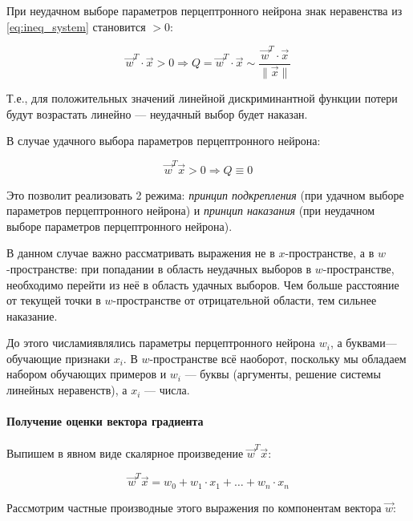 \documentclass{article}
\numberwithin{equation}{subsection}
\begin{document}
При неудачном выборе параметров перцептронного нейрона знак неравенства 
из \ref{eq:ineq_system} становится $>0$:

\begin{equation}
    \vec{w}^T \cdot \vec{x} >0 \Rightarrow Q = \vec{w}^T \cdot \vec{x} \sim \dfrac{\vec{w}^T \cdot \vec{x}}{\| \vec{x} \|}
\end{equation}

Т.е., для положительных значений линейной дискриминантной функции потери будут
возрастать линейно --- неудачный выбор будет \glqq наказан\grqq.

В случае удачного выбора параметров перцептронного нейрона:

\begin{equation}
    \vec{w}^T \vec{x} >0 \Rightarrow Q \equiv 0
\end{equation}

Это позволит реализовать 2 режима: \textit{принцип подкрепления} (при удачном
выборе параметров перцептронного нейрона) и \textit{принцип наказания} 
(при неудачном выборе параметров перцептронного нейрона).

В данном случае важно рассматривать выражения не в $x$-пространстве, 
а в $w$-пространстве: при попадании в область неудачных выборов в $w$-пространстве,
необходимо перейти из неё в область удачных выборов. Чем больше расстояние от текущей
точки в $w$-пространстве от отрицательной области, тем сильнее \glqq наказание\grqq.

До этого \glqq числами\grqq являлись параметры перцептронного нейрона $w_i$, а 
\glqq буквами\grqq --- обучающие признаки $x_i$. В $w$-пространстве всё наоборот,
поскольку мы обладаем набором обучающих примеров и $w_i$ --- \glqq буквы\grqq
(аргументы, решение системы линейных неравенств), а $x_i$ --- \glqq числа\grqq.





\paragraph{Получение оценки вектора градиента}

Выпишем в явном виде скалярное произведение $\vec{w}^T \vec{x}$:

\begin{equation}
    \vec{w}^T \vec{x} = w_0 + w_1 \cdot x_1 + \dots + w_n \cdot x_n
\end{equation}

Рассмотрим частные производные этого выражения по компонентам вектора $\vec{w}$:
\end{document}
